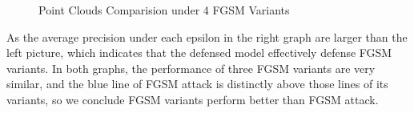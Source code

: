 \begin{figure}[htbp]
%
%
%
%

\centering
\caption{Point Clouds Comparision under 4 FGSM Variants}
\label{fig:PC under 4 Noms Comparsion}
\end{figure}
As the average precision under each epsilon in the right graph are larger than the left picture, 
which indicates that the defensed model effectively defense FGSM variants. In both graphs, the performance of three FGSM variants are very similar, and the blue line of FGSM attack is distinctly above those lines of its variants, so we conclude FGSM variants perform better than FGSM attack.
